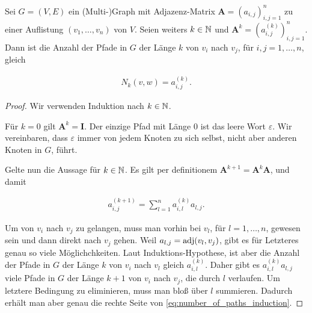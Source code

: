             \begin{theorem} \label{thm:number_of_paths}

                Sei $G = (V, E)$ ein (Multi-)Graph mit Adjazenz-Matrix $\mathbf A = (a_{i,j})_{i,j=1}^n$ zu einer Auflistung $(v_1, \dots, v_n)$ von $V$.
                Seien weiters $k \in \mathbb N$ und $\mathbf A^k = (a_{i,j}^{(k)})_{i,j=1}^n$.
                Dann ist die Anzahl der Pfade in $G$ der Länge $k$ von $v_i$ nach $v_j$, für $i, j = 1, \dots, n$, gleich

                \begin{align*}
                    N_k(v, w) = a_{i,j}^{(k)}.
                \end{align*}

            \end{theorem}

            \begin{proof}

                Wir verwenden Induktion nach $k \in \mathbb N$.

                Für $k = 0$ gilt $\mathbf A^k = \mathbf I$.
                Der einzige Pfad mit Länge $0$ ist das leere Wort $\varepsilon$.
                Wir vereinbaren, dass $\varepsilon$ immer von jedem Knoten zu sich selbst, nicht aber anderen Knoten in $G$, führt.

                Gelte nun die Aussage für $k \in \mathbb N$.
                Es gilt per definitionem $\mathbf A^{k+1} = \mathbf A^k \mathbf A$, und damit

                \begin{align} \label{eq:number_of_paths_induction}
                    a_{i,j}^{(k+1)}
                    =
                    \sum_{l=1}^n
                        a_{i,l}^{(k)}
                        a_{l,j}.
                \end{align}

                Um von $v_i$ nach $v_j$ zu gelangen, muss man vorhin bei $v_l$, für $l = 1, \dots, n$, gewesen sein und dann direkt nach $v_j$ gehen.
                Weil $a_{l, j} = \operatorname{adj}(v_l, v_j)$, gibt es für Letzteres genau so viele Möglichchkeiten.
                Laut Induktions-Hypothese, ist aber die Anzahl der Pfade in $G$ der Länge $k$ von $v_i$ nach $v_l$ gleich $a_{i,l}^{(k)}$.
                Daher gibt es $a_{i,l}^{(k)} a_{l,j}$ viele Pfade in $G$ der Länge $k+1$ von $v_i$ nach $v_j$, die durch $l$ verlaufen.
                Um letztere Bedingung zu eliminieren, muss man bloß über $l$ summieren.
                Dadurch erhält man aber genau die rechte Seite von \ref{eq:number_of_paths_induction}.

            \end{proof}

